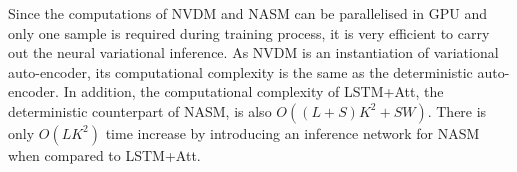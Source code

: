 \documentclass{article}
\begin{document}
\begin{appendices}
Since the computations of NVDM and NASM can be parallelised in GPU and only one sample is required during training process, it is very efficient to carry out the neural variational inference. As NVDM is an instantiation of variational auto-encoder, its computational complexity is the same as the deterministic auto-encoder. In addition, the computational complexity of LSTM+Att, the deterministic counterpart of NASM, is also $O((L+S)K^2+SW)$. There is only $O(LK^2)$ time increase by introducing an inference network for NASM when compared to LSTM+Att.

\end{appendices}
\end{document}
